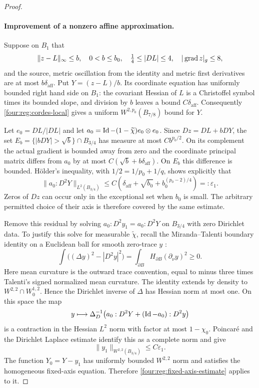 \begin{proof}
\paragraph{Improvement of a nonzero affine approximation.}
Suppose on $B_1$ that
\begin{equation}\label{four:reg:affine-input}
 \|z-L\|_\infty\le b,\quad 0<b\le b_0,\quad
 \tfrac14\le|DL|\le4,\quad |\operatorname{grad} z|_g\le8,
\end{equation}
and the source, metric oscillation from the identity and metric
first derivatives are at most $b\delta_{\mathrm{aff}}$.  Put $Y=(z-L)/b$.
Its coordinate equation has uniformly bounded right hand side on
$B_1$: the covariant Hessian of $L$ is a Christoffel symbol times
its bounded slope, and division by $b$ leaves a bound $C\delta_{\mathrm{aff}}$.
Consequently \eqref{four:reg:cordes-local} gives a uniform
$W^{2,p_0}(B_{7/8})$ bound for $Y$.

Let $e_0=DL/|DL|$ and let $a_0=\operatorname{Id}-(1-\widetilde\chi)e_0\otimes e_0$.
Since $Dz=DL+bDY$, the set
$E_b=\{|bDY|>\sqrt b\}\cap B_{3/4}$ has measure at most
$Cb^{p_0/2}$.  On its complement the actual gradient is bounded
away from zero and the coordinate principal matrix differs from
$a_0$ by at most $C(\sqrt b+b\delta_{\mathrm{aff}})$.  On $E_b$ this difference
is bounded.  H\"older's inequality, with
$1/2=1/p_0+1/q$, shows explicitly that
\begin{equation}\label{four:reg:small-fixed-source}
 \|a_0:D^2Y\|_{L^2(B_{3/4})}
 \le C\left(\delta_{\mathrm{aff}}+\sqrt{b_0}
                  +b_0^{(p_0-2)/4}\right)=:\varepsilon_1.
\end{equation}
Zeros of $Dz$ can occur only in the exceptional set when $b_0$ is
small.  The arbitrary permitted choice of their axis is therefore
covered by the same estimate.

Remove this residual by solving $a_0:D^2y_1=a_0:D^2Y$ on $B_{3/4}$
with zero Dirichlet data.  To justify this solve for measurable
$\widetilde\chi$, recall the Miranda--Talenti boundary identity on a
Euclidean ball for smooth zero-trace $y$
\cite[Section~2, Theorem~3, p.~297]{Talenti1965}:
\[
 \int\bigl((\Delta y)^2-|D^2y|^2\bigr)
       =\int_{\partial B}H_{\partial B}(\partial_\nu y)^2\ge0.
\]
Here mean curvature is the outward trace convention, equal to minus
three times Talenti's signed normalized mean curvature. The identity
extends by density to $W^{2,2}\cap W^{1,2}_0$.  Hence the
Dirichlet inverse of $\Delta$ has Hessian norm at most one.
On this space the map
\[
 y\longmapsto\Delta_D^{-1}
       \bigl(a_0:D^2Y+(\operatorname{Id}-a_0):D^2y\bigr)
\]
is a contraction in the Hessian $L^2$ norm with factor at most
$1-\chi_0$.  Poincar\'e and the Dirichlet Laplace estimate identify
this as a complete norm and give
\begin{equation}\label{four:reg:small-correction}
 \|y_1\|_{W^{2,2}(B_{3/4})}\le C\varepsilon_1.
\end{equation}
The function $Y_0=Y-y_1$ has uniformly bounded $W^{2,2}$ norm and
satisfies the homogeneous fixed-axis equation.  Therefore
\eqref{four:reg:fixed-axis-estimate} applies to it.


\end{proof}
